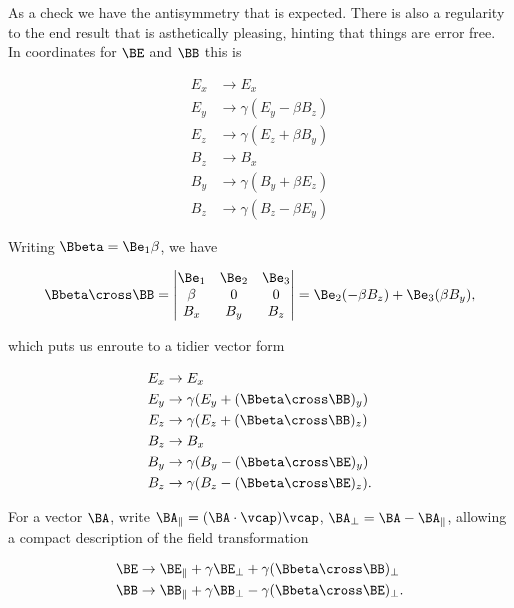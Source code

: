 As a check we have the antisymmetry that is expected.  There is also a regularity to the end result that is asthetically pleasing, hinting that things are error free.  In coordinates for $\BE$ and $\BB$ this is

\begin{align}\label{eqn:relElectroDynProblemSet3:1320}
E_x &\rightarrow E_x \\
E_y &\rightarrow \gamma ( E_y - \beta B_z ) \\
E_z &\rightarrow \gamma ( E_z + \beta B_y ) \\
B_z &\rightarrow B_x \\
B_y &\rightarrow \gamma ( B_y + \beta E_z ) \\
B_z &\rightarrow \gamma ( B_z - \beta E_y ) 
\end{align}

Writing $\Bbeta = \Be_1 \beta$, we have

\begin{equation}\label{eqn:relElectroDynProblemSet3:1340}
\Bbeta \cross \BB = 
\begin{vmatrix} 
\Be_1 & \Be_2 & \Be_3 \\
\beta & 0 & 0 \\
B_x & B_y & B_z
\end{vmatrix} 
= \Be_2 (-\beta B_z) + \Be_3( \beta B_y ),
\end{equation}

which puts us enroute to a tidier vector form

\begin{align}\label{eqn:relElectroDynProblemSet3:1360}
E_x &\rightarrow E_x \\
E_y &\rightarrow \gamma ( E_y + (\Bbeta \cross \BB)_y ) \\
E_z &\rightarrow \gamma ( E_z + (\Bbeta \cross \BB)_z ) \\
B_z &\rightarrow B_x \\
B_y &\rightarrow \gamma ( B_y - (\Bbeta \cross \BE)_y ) \\
B_z &\rightarrow \gamma ( B_z - (\Bbeta \cross \BE)_z ).
\end{align}

For a vector $\BA$, write $\BA_\parallel = (\BA \cdot \vcap)\vcap$, $\BA_\perp = \BA - \BA_\parallel$, allowing a compact description of the field transformation

\begin{align}\label{eqn:relElectroDynProblemSet3:1380}
\BE &\rightarrow \BE_\parallel + \gamma \BE_\perp + \gamma (\Bbeta \cross \BB)_\perp \\
\BB &\rightarrow \BB_\parallel + \gamma \BB_\perp - \gamma (\Bbeta \cross \BE)_\perp.
\end{align}

